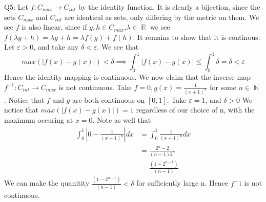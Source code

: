 \documentclass[letterpaper]{article}
\DeclareMathOperator{\R}{\mathbb{R}}
\DeclareMathOperator{\N}{\mathbb{N}}
\begin{document}
\noindent Q5: Let $f:C_{max}\rightarrow C_{int}$ by the identity function. It is clearly a bijection, since the sets $C_{max}$ and $C_{int}$ are identical as sets, only differing by the metric on them. 
We see $f$ is also linear, since if $g,h\in C_{max}$,$\lambda\in \R$ we see $f(\lambda g + h) = \lambda g + h = \lambda f(g)+f(h)$. It remains to show that it is continous. Let $\varepsilon > 0$, and take any $\delta <\varepsilon$. 
We see that $$max(|f(x)-g(x)|)<\delta \implies \int_0^1 |f(x)-g(x)| \leq \int_0^1 \delta  = \delta < \varepsilon$$
Hence the identity mapping is continuous. We now claim that the inverse map $f^{-1}:C_{int}\rightarrow C_{max}$ is not continuous. 
Take $f=0,g(x) = \frac{1}{(x+1)^n}$ for some $n\in\N$. Notice that $f$ and $g$ are both continuous on $[0,1]$. Take $\varepsilon = 1$, and $\delta >0$ We notice that $max(|f(x)-g(x)|)=1$ regardless of our choice of n, with the maximum occuring at $x=0$. 
Note as well that 
\begin{align*}
    \int_0^1 |0-\frac{1}{(x+1)^n}|dx & = \int_0^1 \frac{1}{(x+1)^n}dx
    \\ & = \frac{2^n-2}{(n-1)2^n}
    \\ & = \frac{(1-2^{n-1})}{(n-1)}
\end{align*}
We can make the quanitity $\frac{(1-2^{n-1})}{(n-1)}<\delta$ for sufficiently large n. Hence $f^-1$ is not continuous. 
\end{document}
